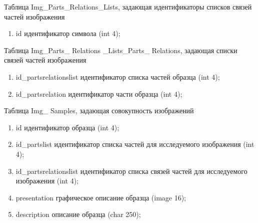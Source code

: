 \noindent 
Таблица Img\_Parts\_Relations\_Lists, задающая идентификаторы списков связей частей изображения
\small
\begin{enumerate}
\item id 			идентификатор символа (int 4);
\end{enumerate}
\normalsize


\noindent 
Таблица Img\_Parts\_ Relations \_Lists\_Parts\_ Relations, задающая списки связей частей изображения
\small
\begin{enumerate}
\item id\_partsrelationslist          	идентификатор списка частей образца (int 4);
\item id\_partsrelation                 идентификатор части образца (int 4);
\end{enumerate}
\normalsize


\noindent 
Таблица Img\_ Samples, задающая совокупность изображений
\small
\begin{enumerate}
\item id			     	идентификатор образца (int 4);
\item id\_partslist		    	идентификатор списка частей для исследуемого изображения (int 4);
\item id\_partsrelationslist	идентификатор списка связей частей для исследуемого изображения  (int 4);                                   
\item presentation	  	графическое описание образца (image   16);
\item description           		описание образца (char   250);
\end{enumerate}
\normalsize


